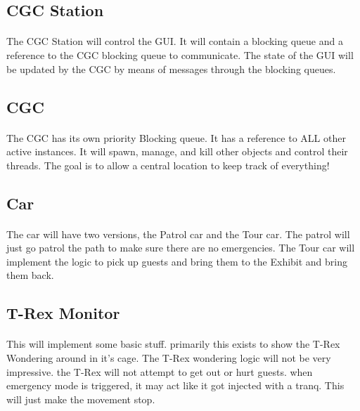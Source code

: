 \documentclass[12pt]{article}
\begin{document}
\subsection{CGC Station}
\paragraph{} The CGC Station will control the GUI. It will contain a blocking queue and a reference to the CGC blocking queue to communicate. The state of the GUI
will be updated by the CGC by means of messages through the blocking queues.

\subsection{CGC}
\paragraph{} The CGC has its own priority Blocking queue. It has a reference to ALL other active 
instances. It will spawn, manage, and kill other objects and control their threads. 
The goal is to allow a central location to keep track of everything!

\subsection{Car}
\paragraph{} The car will have two versions, the Patrol car and the Tour car. 
The patrol will just go patrol the path to make sure there are no emergencies. The Tour car will implement the logic to pick 
up guests and bring them to the Exhibit and bring them back.

\subsection{T-Rex Monitor}
\paragraph{} This will implement some basic stuff. primarily this exists to show the T-Rex Wondering around in it's cage. 
The T-Rex wondering logic will not be very impressive. the T-Rex will not attempt to get out or 
hurt guests. when emergency mode is triggered, 
it may act like it got injected with a tranq. This will just make the movement stop.
\end{document}
